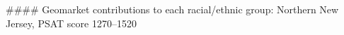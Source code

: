 #### Geomarket contributions to each racial/ethnic group: Northern New Jersey, PSAT score 1270–1520
